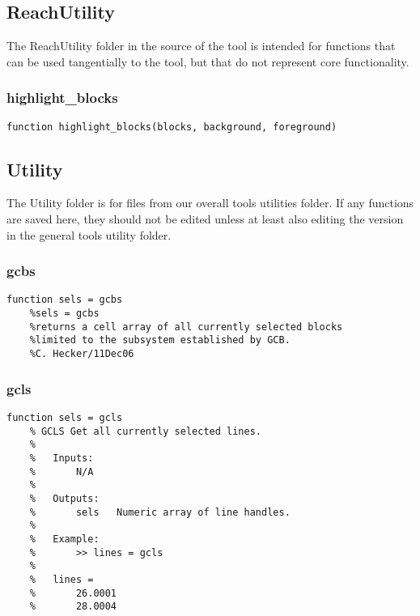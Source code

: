 \documentclass[12pt,letterpaper]{report}
\begin{document}
	\subsection{ReachUtility}
		The ReachUtility folder in the source of the tool is intended for functions that can be used tangentially to the tool, but that do not represent core functionality.
		\subsubsection{highlight\_blocks}
\begin{lstlisting}
function highlight_blocks(blocks, background, foreground)
\end{lstlisting}
		
	\subsection{Utility}
		The Utility folder is for files from our overall tools utilities folder.
		If any functions are saved here, they should not be edited unless at least also editing the version in the general tools utility folder.
		\subsubsection{gcbs}
\begin{lstlisting}
function sels = gcbs
    %sels = gcbs
    %returns a cell array of all currently selected blocks
    %limited to the subsystem established by GCB.
    %C. Hecker/11Dec06
\end{lstlisting}
		\subsubsection{gcls}
\begin{lstlisting}
function sels = gcls
    % GCLS Get all currently selected lines.
    %
    %   Inputs:
    %       N/A
    %
    %   Outputs:
    %       sels   Numeric array of line handles.
    %
    %   Example:
    %       >> lines = gcls
    %
    %   lines =
    %       26.0001
    %       28.0004
\end{lstlisting}
	
\end{document}
